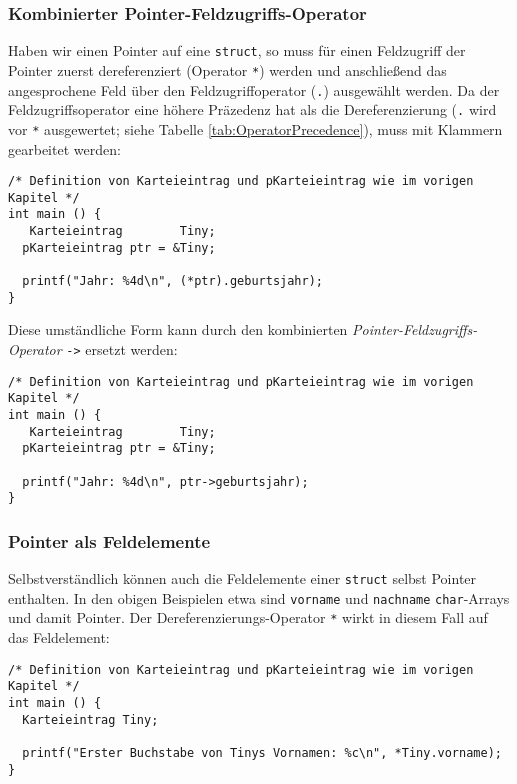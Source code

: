 \subsubsection{Kombinierter Pointer-Feldzugriffs-Operator}
Haben wir einen Pointer auf eine \texttt{struct}, so muss für einen Feldzugriff der Pointer zuerst dereferenziert (Operator \texttt{*}) werden und anschließend das angesprochene Feld über den Feldzugriffoperator (\texttt{.}) ausgewählt werden. Da der Feldzugriffsoperator eine höhere Präzedenz hat als die Dereferenzierung (\ie \texttt{.} wird vor \texttt{*} ausgewertet; siehe Tabelle \ref{tab:OperatorPrecedence}), muss mit Klammern gearbeitet werden:

\begin{codebox}
\begin{verbatim}
/* Definition von Karteieintrag und pKarteieintrag wie im vorigen Kapitel */
int main () {
   Karteieintrag        Tiny;
  pKarteieintrag ptr = &Tiny;
  
  printf("Jahr: %4d\n", (*ptr).geburtsjahr);
}
\end{verbatim}
\end{codebox}

Diese umständliche Form kann durch den kombinierten \emph{Pointer-Feldzugriffs-Operator} \texttt{->} ersetzt werden:

\begin{codebox}
\begin{verbatim}
/* Definition von Karteieintrag und pKarteieintrag wie im vorigen Kapitel */
int main () {
   Karteieintrag        Tiny;
  pKarteieintrag ptr = &Tiny;
  
  printf("Jahr: %4d\n", ptr->geburtsjahr);
}
\end{verbatim}
\end{codebox}

\subsubsection{Pointer als Feldelemente}
Selbstverständlich können auch die Feldelemente einer \texttt{struct} selbst Pointer enthalten. In den obigen Beispielen etwa sind \texttt{vorname} und \texttt{nachname} \texttt{char}-Arrays und damit Pointer. Der Dereferenzierungs-Operator \texttt{*} wirkt in diesem Fall auf das Feldelement:
\begin{codebox}
\begin{verbatim}
/* Definition von Karteieintrag und pKarteieintrag wie im vorigen Kapitel */
int main () {
  Karteieintrag Tiny;
  
  printf("Erster Buchstabe von Tinys Vornamen: %c\n", *Tiny.vorname);
}
\end{verbatim}
\end{codebox}

